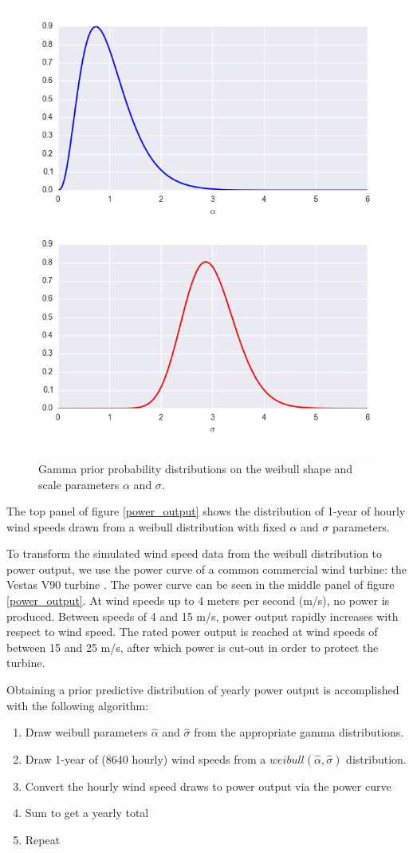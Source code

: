 \documentclass[11pt]{article}
\begin{document}
\begin{figure}
	\includegraphics[width=.7\textwidth]{figures/priors.png}
	\caption{Gamma prior probability distributions on the weibull shape and scale parameters $\alpha$ and $\sigma$.}
	\label{priors}
\end{figure}

The top panel of figure \ref{power_output} shows the distribution of 1-year of hourly wind speeds drawn from a weibull distribution with fixed $\alpha$ and $\sigma$ parameters.

To transform the simulated wind speed data from the weibull distribution to power output, we use the power curve of a common commercial wind turbine: the Vestas V90 turbine \citep{vestas_v90}. The power curve can be seen in the middle panel of figure \ref{power_output}. At wind speeds up to 4 meters per second (m/s), no power is produced. Between speeds of 4 and 15 m/s, power output rapidly increases with respect to wind speed. The rated power output is reached at wind speeds of between 15 and 25 m/s, after which power is cut-out in order to protect the turbine. 

Obtaining a prior predictive distribution of yearly power output is accomplished with the following algorithm:

\begin{enumerate}
\item Draw weibull parameters $\hat{\alpha}$ and $\hat{\sigma}$ from the appropriate gamma distributions. 
\item Draw 1-year of (8640 hourly) wind speeds from a $weibull(\hat{\alpha},\hat{\sigma})$ distribution.
\item Convert the hourly wind speed draws to power output via the power curve
\item Sum to get a yearly total
\item Repeat
\end{enumerate}  
\end{document}

